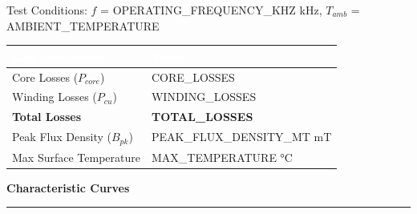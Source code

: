 \documentclass[10pt,a4paper]{article}
\newcommand{\sectiontitle}[1]{%
    \vspace{3mm}%
    {\large\bfseries\color{primary}#1}%
    \vspace{1mm}%
    \hrule height 0.3pt%
    \vspace{2mm}%
}
\begin{document}
\begin{minipage}[t]{0.48\textwidth}
{\footnotesize
Test Conditions: $f$ = {{OPERATING_FREQUENCY_KHZ}} kHz, $T_{amb}$ = {{AMBIENT_TEMPERATURE}}

\vspace{2mm}
\begin{tabular}{|L{35mm}|L{25mm}|}
\hline
{}
\textcolor{white}{\textbf{Loss Component}} & \textcolor{white}{\textbf{Value}} \\
\hline
Core Losses ($P_{core}$) & {{CORE_LOSSES}} \\
Winding Losses ($P_{cu}$) & {{WINDING_LOSSES}} \\
\textbf{Total Losses} & \textbf{{{TOTAL_LOSSES}}} \\
\hline
{}
Peak Flux Density ($B_{pk}$) & {{PEAK_FLUX_DENSITY_MT}} mT \\
Max Surface Temperature & {{MAX_TEMPERATURE}} °C \\
\hline
\end{tabular}
}
\end{minipage}
\hfill
\begin{minipage}[t]{0.48\textwidth}
\centering
\end{minipage}

\vspace{4mm}

\sectiontitle{Characteristic Curves}
\end{document}
